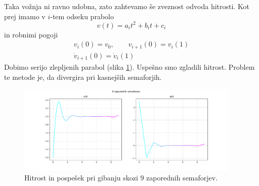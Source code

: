 \documentclass[a4paper, 12pt, slovene]{article}
\numberwithin{equation}{section}
\begin{document}
Taka vožnja ni ravno udobna, zato zahtevamo še zveznost odvoda hitrosti. Kot prej imamo v $i$-tem odseku prabolo
\begin{equation}
v(t) = a_it^2 + b_it + c_i
\end{equation}
in robnimi pogoji
\begin{eqnarray}
v_i(0) = v_0, \qquad v_{i+1}(0) = v_i(1) \\
\dot{v}_{i+1}(0) = \dot{v}_i(1)
\end{eqnarray}
Dobimo serijo zlepljenih parabol (slika \ref{f:zaporedni}). Uspešno smo zgladili hitrost. Problem te metode je, da divergira pri kasnejših semaforjih.

\begin{figure}[H]
\centering
\includegraphics[width=0.95\textwidth]{grafi/zaporedni_fin_9.pdf}
\caption{Hitrost in pospešek pri gibanju skozi 9 zaporednih semaforjev.}
\label{f:zaporedni}
\end{figure}
\end{document}
